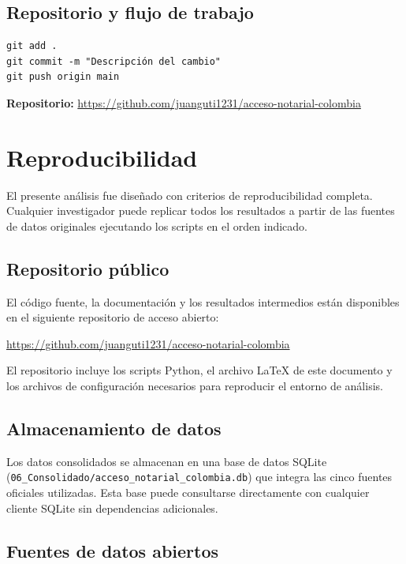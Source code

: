 \documentclass{article}
\begin{document}
\subsection{Repositorio y flujo de trabajo}

\begin{verbatim}
git add .
git commit -m "Descripción del cambio"
git push origin main
\end{verbatim}

\textbf{Repositorio:}
\url{https://github.com/juanguti1231/acceso-notarial-colombia}

\newpage
\section{Reproducibilidad}
\label{sec:reproducibilidad}

El presente análisis fue diseñado con criterios de reproducibilidad
completa. Cualquier investigador puede replicar todos los resultados
a partir de las fuentes de datos originales ejecutando los scripts
en el orden indicado.

\subsection{Repositorio público}

El código fuente, la documentación y los resultados intermedios están
disponibles en el siguiente repositorio de acceso abierto:

\begin{center}
\url{https://github.com/juanguti1231/acceso-notarial-colombia}
\end{center}

El repositorio incluye los scripts Python, el archivo \LaTeX{} de este
documento y los archivos de configuración necesarios para reproducir
el entorno de análisis.

\subsection{Almacenamiento de datos}

Los datos consolidados se almacenan en una base de datos SQLite
(\texttt{06\_Consolidado/acceso\_notarial\_colombia.db}) que integra
las cinco fuentes oficiales utilizadas. Esta base puede consultarse
directamente con cualquier cliente SQLite sin dependencias adicionales.

\subsection{Fuentes de datos abiertos}
\end{document}
